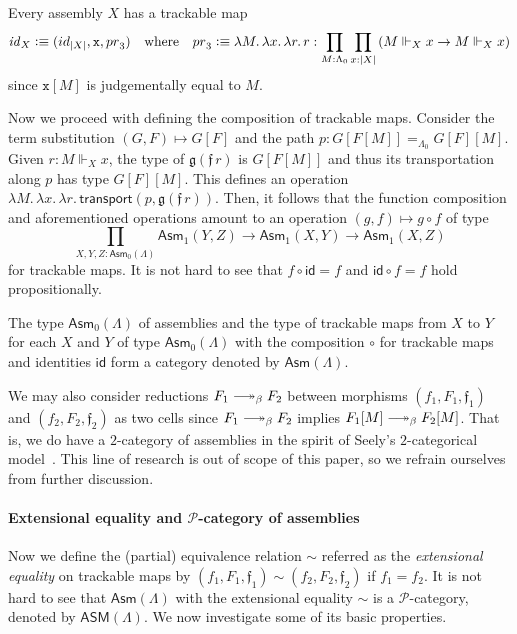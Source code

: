 \documentclass[a4paper,UKenglish,numberwithinsect,cleveref,thm-restate]{lipics-v2021}
\newcommand{\PP}{\mathscr{P}}
\newcommand{\Asm}{\mathsf{Asm}}
\newcommand{\ASM}{\mathsf{ASM}}
\newcommand{\defeq}{\vcentcolon\equiv}
\newcommand{\id}{\mathsf{id}}
\newcommand{\iid}{\mathit{id}}
\newcommand{\pr}{\mathsf{pr}}
\DeclareRobustCommand\longtwoheadrightarrow{\relbar\joinrel\twoheadrightarrow}
\newcommand{\reduce}{\longtwoheadrightarrow_{\beta}}
\theoremstyle{plain}
\begin{document}
\begin{example}[Identity]
  Every assembly $X$ has a trackable map
  \[
    \iid_X \defeq (\id_{|X|}, \mathtt{x}, \pr_3)
    \quad\text{where}\quad
  \pr_3 \defeq \lambda M.\,\lambda x.\,\lambda r.\, r : \prod_{M : \Lambda_0} \prod_{x : |X|} \left( M \Vdash_X x \to M  \Vdash_X x  \right)
  \]
  since $\mathtt{x}[M]$ is judgementally equal to $M$.
\end{example}
Now we proceed with defining the composition of trackable maps. Consider the term substitution $(G, F)
\mapsto G [ F ]$ and the path $p : G[F[M]] =_{\Lambda_0} G[F] [M]$.
Given $r : M \Vdash_X x$, the type of $\mathfrak{g}(\mathfrak{f}\,r)$ is $G[F[M]]$ and thus its transportation along $p$ has type $G[F][M]$.
This defines an operation $\lambda M.\,\lambda x.\,\lambda r.\, \mathsf{transport}(p, \mathfrak{g}(\mathfrak{f}\,r))$.
Then, it follows that the function composition and aforementioned operations amount to an operation $(g, f) \mapsto g \circ f$ of type
\[
  \prod_{X, Y, Z : \Asm_0(\Lambda)} \Asm_1(Y, Z) \to \Asm_1(X, Y) \to \Asm_1(X, Z)
\]
for trackable maps. It is not hard to see that $f \circ \id = f$ and $\id \circ f = f$ hold propositionally.

\begin{proposition}\label{prop:category-of-assemblies}
  The type $\Asm_0(\Lambda)$ of assemblies and the type of trackable maps from $X$ to $Y$ for each $X$ and $Y$ of type $\Asm_0(\Lambda)$ with the composition $\circ$ for trackable maps and identities $\id$ form a category denoted by $\Asm(\Lambda)$.
\end{proposition}
We may also consider reductions $F_1 \reduce F_2$ between morphisms $(f_1, F_1, \mathfrak{f}_1)$
and $(f_2, F_2, \mathfrak{f}_2)$ as two cells since $F_1 \reduce F_2$ implies $F_1[M] \reduce F_2[M]$.
That is, we do have a $2$-category of assemblies in the spirit of Seely's $2$-categorical model~\cite{Seely1987}.
This line of research is out of scope of this paper, so we refrain ourselves from further discussion. 


\paragraph*{Extensional equality and \texorpdfstring{$\PP$}{P}-category of assemblies}
Now we define the (partial) equivalence relation $\sim$ referred as the \emph{extensional equality} on trackable maps by $(f_1, F_1, \mathfrak{f}_1) \sim (f_2, F_2, \mathfrak{f}_2)$ if $f_1 = f_2$.
It is not hard to see that $\Asm(\Lambda)$ with the extensional equality $\sim$ is a $\PP$-category, denoted by $\ASM(\Lambda)$. 
We now investigate some of its basic properties.
\end{document}
